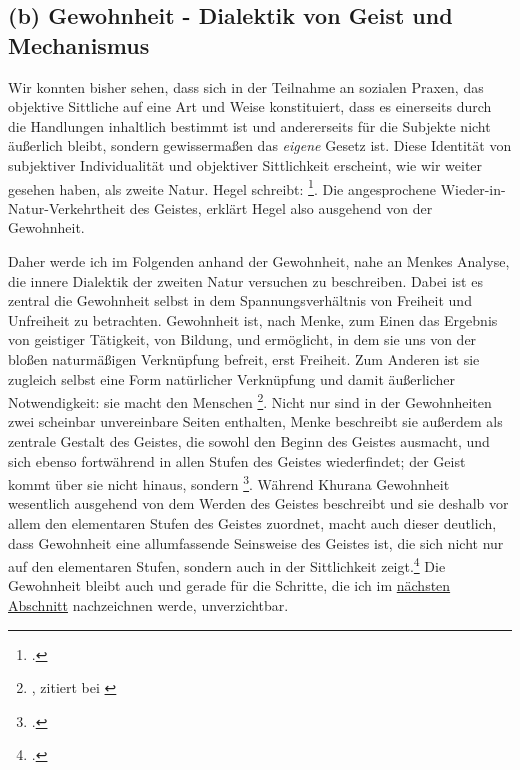 \documentclass[12pt, a4paper, openany]{report}
\begin{document}
\subsection{(b) Gewohnheit - Dialektik von Geist und Mechanismus}
Wir konnten bisher sehen, dass sich in der Teilnahme an sozialen Praxen, das objektive Sittliche auf eine Art und Weise konstituiert, dass es einerseits durch die Handlungen inhaltlich bestimmt ist und andererseits für die Subjekte nicht äußerlich bleibt, sondern gewissermaßen das \emph{eigene} Gesetz ist. 
Diese Identität von subjektiver Individualität und objektiver Sittlichkeit erscheint, wie wir weiter gesehen haben, als zweite Natur.
Hegel schreibt: \footcite[][§ 151, S. 166]{hegel_grundlinien_2017}.
Die angesprochene Wieder-in-Natur-Verkehrtheit des Geistes, erklärt Hegel also ausgehend von der Gewohnheit.
\begin{comment}
\footnote{
    Allerdings ist, wenn man das obige Zitat genau nimmt, die Gewohnheit eine Teilmenge der Sitte (\qq{die Gewohnheit derselben}) und nur die Gewohnheit tritt als zweite Natur auf.
    Es gibt demnach an dem Sittlichen und auch an der Sitte, etwas, das nicht Gewohnheit, nicht zweite Natur ist. 
    Bzw. es bleibt unklar, wie viele der sozialen Handlungen im Rahmen der sozialen Praxis zur Gewohnheit werden, oder Gewohnheit sind und wo innerhalb derselben Platz für nicht-gewohnheitsmäßige Handlungen ist. 
}
\end{comment}
Daher werde ich im Folgenden anhand der Gewohnheit, nahe an Menkes Analyse, die innere Dialektik der zweiten Natur versuchen zu beschreiben.
Dabei ist es zentral die Gewohnheit selbst in dem Spannungsverhältnis von Freiheit und Unfreiheit zu betrachten. 
Gewohnheit ist, nach Menke, zum Einen das Ergebnis von geistiger Tätigkeit, von Bildung, und ermöglicht, in dem sie uns von der bloßen naturmäßigen Verknüpfung befreit, erst Freiheit.
Zum Anderen ist sie zugleich selbst eine Form natürlicher Verknüpfung und damit äußerlicher Notwendigkeit: sie macht den Menschen \footnote{, zitiert bei \cite[][127]{menke_autonomie_2018}}.
Nicht nur sind in der Gewohnheiten zwei scheinbar unvereinbare Seiten enthalten, Menke beschreibt sie außerdem als zentrale Gestalt des Geistes, die sowohl den Beginn des Geistes ausmacht, und sich ebenso fortwährend in allen Stufen des Geistes wiederfindet; 
der Geist kommt über sie nicht hinaus, sondern \footcite[][129]{menke_autonomie_2018}.
Während Khurana Gewohnheit wesentlich ausgehend von dem Werden des Geistes beschreibt und sie deshalb vor allem den elementaren Stufen des Geistes zuordnet, macht auch dieser deutlich, dass Gewohnheit eine allumfassende Seinsweise des Geistes ist, die sich nicht nur auf den elementaren Stufen, sondern auch in der Sittlichkeit zeigt.\footcite[Vgl.][433]{khurana_freiheit_2017}
Die Gewohnheit bleibt auch und gerade für die Schritte, die ich im \hyperref[kritik_affirmation]{nächsten Abschnitt} nachzeichnen werde, unverzichtbar.\\
\end{document}
